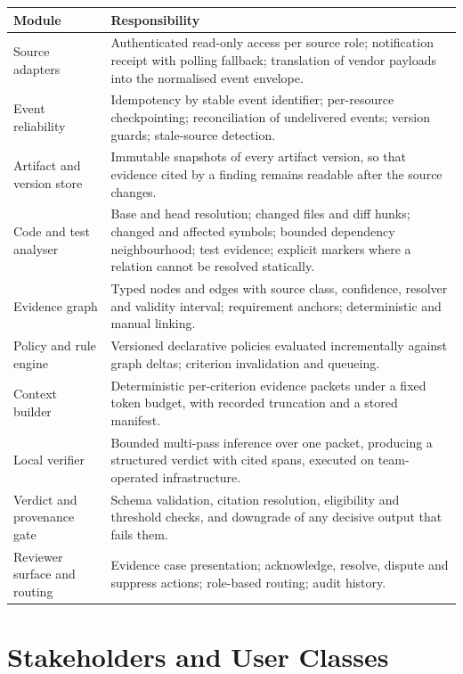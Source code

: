 \begin{longtable}{>{\raggedright\arraybackslash}p{}>{\raggedright\arraybackslash}p{}}
\toprule
Module & Responsibility \\
\midrule
\endhead
Source adapters
  & Authenticated read-only access per source role; notification receipt with
    polling fallback; translation of vendor payloads into the normalised event
    envelope. \\
Event reliability
  & Idempotency by stable event identifier; per-resource checkpointing;
    reconciliation of undelivered events; version guards; stale-source
    detection. \\
Artifact and version store
  & Immutable snapshots of every artifact version, so that evidence cited by a
    finding remains readable after the source changes. \\
Code and test analyser
  & Base and head resolution; changed files and diff hunks; changed and
    affected symbols; bounded dependency neighbourhood; test evidence; explicit
    markers where a relation cannot be resolved statically. \\
Evidence graph
  & Typed nodes and edges with source class, confidence, resolver and validity
    interval; requirement anchors; deterministic and manual linking. \\
Policy and rule engine
  & Versioned declarative policies evaluated incrementally against graph
    deltas; criterion invalidation and queueing. \\
Context builder
  & Deterministic per-criterion evidence packets under a fixed token budget,
    with recorded truncation and a stored manifest. \\
Local verifier
  & Bounded multi-pass inference over one packet, producing a structured verdict
    with cited spans, executed on team-operated infrastructure. \\
Verdict and provenance gate
  & Schema validation, citation resolution, eligibility and threshold checks,
    and downgrade of any decisive output that fails them. \\
Reviewer surface and routing
  & Evidence case presentation; acknowledge, resolve, dispute and suppress
    actions; role-based routing; audit history. \\
\bottomrule
\end{longtable}

\section{Stakeholders and User Classes}

